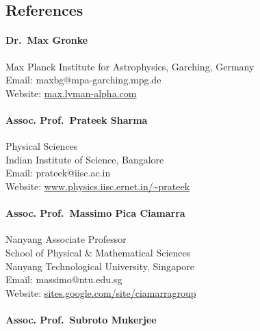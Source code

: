 \documentclass[
  a4paper,
  11pt,
  oneside]{article}
\let\oldparagraph\paragraph
\renewcommand{\paragraph}[1]{\oldparagraph{#1}\mbox{}}
\begin{document}
\newpage{}

\hypertarget{references}{%
\subsection{References}\label{references}}

\hypertarget{dr.-max-gronke}{%
\paragraph{Dr.~Max Gronke}\label{dr.-max-gronke}}

Max Planck Institute for Astrophysics, Garching, Germany\\
Email: maxbg@mpa-garching.mpg.de\\
Website: \href{http://max.lyman-alpha.com}{max.lyman-alpha.com}

\hypertarget{assoc.-prof.-prateek-sharma}{%
\paragraph{Assoc. Prof.~Prateek
Sharma}\label{assoc.-prof.-prateek-sharma}}

Physical Sciences\\
Indian Institute of Science, Bangalore\\
Email: prateek@iisc.ac.in\\
Website:
\href{http://www.physics.iisc.ernet.in/~prateek/}{www.physics.iisc.ernet.in/\textasciitilde prateek}

\hypertarget{assoc.-prof.-massimo-pica-ciamarra}{%
\paragraph{Assoc. Prof.~Massimo Pica
Ciamarra}\label{assoc.-prof.-massimo-pica-ciamarra}}

Nanyang Associate Professor\\
School of Physical \& Mathematical Sciences\\
Nanyang Technological University, Singapore\\
Email: massimo@ntu.edu.sg\\
Website:
\href{https://sites.google.com/site/ciamarragroup/}{sites.google.com/site/ciamarragroup}

\hypertarget{assoc.-prof.-subroto-mukerjee}{%
\paragraph{Assoc. Prof.~Subroto
Mukerjee}\label{assoc.-prof.-subroto-mukerjee}}
\end{document}
